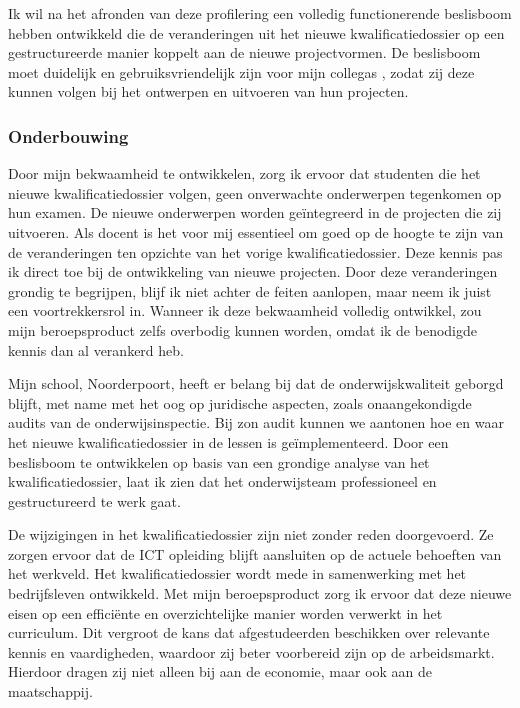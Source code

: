 Ik wil na het afronden van deze profilering een volledig functionerende beslisboom hebben ontwikkeld die de veranderingen uit het nieuwe kwalificatiedossier op een gestructureerde manier koppelt aan de nieuwe projectvormen. De beslisboom moet duidelijk en gebruiksvriendelijk zijn voor mijn collega\textquotesingle s
, zodat zij deze kunnen volgen bij het ontwerpen en uitvoeren van hun projecten.



\subsubsection{Onderbouwing}
Door mijn bekwaamheid te ontwikkelen, zorg ik ervoor dat studenten die het nieuwe kwalificatiedossier volgen, geen onverwachte onderwerpen tegenkomen op hun examen. De nieuwe onderwerpen worden geïntegreerd in de projecten die zij uitvoeren. Als docent is het voor mij essentieel om goed op de hoogte te zijn van de veranderingen ten opzichte van het vorige kwalificatiedossier. Deze kennis pas ik direct toe bij de ontwikkeling van nieuwe projecten. Door deze veranderingen grondig te begrijpen, blijf ik niet achter de feiten aanlopen, maar neem ik juist een voortrekkersrol in. Wanneer ik deze bekwaamheid volledig ontwikkel, zou mijn beroepsproduct zelfs overbodig kunnen worden, omdat ik de benodigde kennis dan al verankerd heb.

Mijn school, Noorderpoort, heeft er belang bij dat de onderwijskwaliteit geborgd blijft, met name met het oog op juridische aspecten, zoals onaangekondigde audits van de onderwijsinspectie. Bij zo\textquotesingle n audit kunnen we aantonen hoe en waar het nieuwe kwalificatiedossier in de lessen is geïmplementeerd. Door een beslisboom te ontwikkelen op basis van een grondige analyse van het kwalificatiedossier, laat ik zien dat het onderwijsteam professioneel en gestructureerd te werk gaat.

De wijzigingen in het kwalificatiedossier zijn niet zonder reden doorgevoerd. Ze zorgen ervoor dat de ICT opleiding blijft aansluiten op de actuele behoeften van het werkveld. Het kwalificatiedossier wordt mede in samenwerking met het bedrijfsleven ontwikkeld. Met mijn beroepsproduct zorg ik ervoor dat deze nieuwe eisen op een efficiënte en overzichtelijke manier worden verwerkt in het curriculum. Dit vergroot de kans dat afgestudeerden beschikken over relevante kennis en vaardigheden, waardoor zij beter voorbereid zijn op de arbeidsmarkt. Hierdoor dragen zij niet alleen bij aan de economie, maar ook aan de maatschappij.

